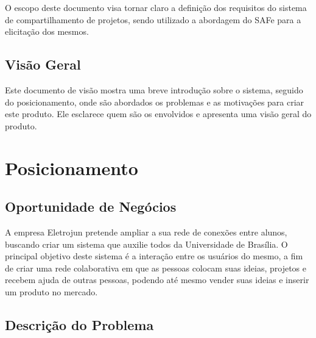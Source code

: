 \begin{apendicesenv}
O escopo deste documento visa tornar claro a definição dos requisitos do sistema de compartilhamento de projetos, sendo utilizado a abordagem do SAFe para a elicitação dos mesmos.

\subsection{Visão Geral}

Este documento de visão mostra uma breve introdução sobre o sistema, seguido do posicionamento, onde são abordados os problemas e as motivações para criar este produto. Ele esclarece quem são os envolvidos e  apresenta uma visão geral do produto.

\section{Posicionamento}

\subsection{Oportunidade de Negócios}

A empresa Eletrojun pretende ampliar a sua rede de conexões entre alunos, buscando criar um sistema que auxilie todos da Universidade de Brasília. O principal objetivo deste sistema é a interação entre os usuários do mesmo, a fim de criar uma rede colaborativa em que as pessoas colocam suas ideias, projetos e recebem ajuda de outras pessoas, podendo até mesmo vender suas ideias e inserir um produto no mercado.

\subsection{Descrição do Problema}


\end{apendicesenv}
